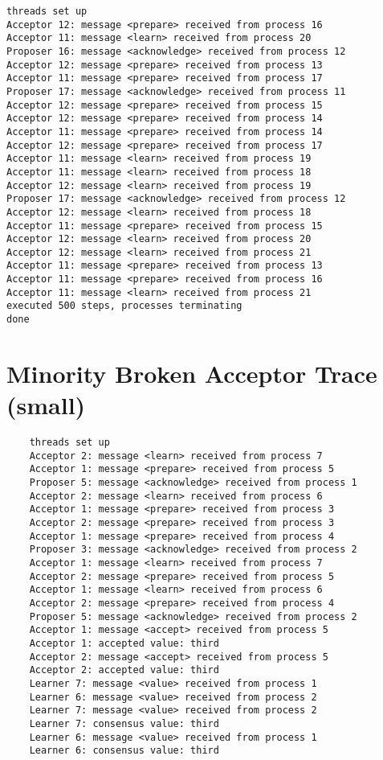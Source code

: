 \documentclass[a4paper, 12pt]{article}
\begin{document}
\begin{lstlisting}
threads set up
Acceptor 12: message <prepare> received from process 16
Acceptor 11: message <learn> received from process 20
Proposer 16: message <acknowledge> received from process 12
Acceptor 12: message <prepare> received from process 13
Acceptor 11: message <prepare> received from process 17
Proposer 17: message <acknowledge> received from process 11
Acceptor 12: message <prepare> received from process 15
Acceptor 12: message <prepare> received from process 14
Acceptor 11: message <prepare> received from process 14
Acceptor 12: message <prepare> received from process 17
Acceptor 11: message <learn> received from process 19
Acceptor 11: message <learn> received from process 18
Acceptor 12: message <learn> received from process 19
Proposer 17: message <acknowledge> received from process 12
Acceptor 12: message <learn> received from process 18
Acceptor 11: message <prepare> received from process 15
Acceptor 12: message <learn> received from process 20
Acceptor 12: message <learn> received from process 21
Acceptor 11: message <prepare> received from process 13
Acceptor 11: message <prepare> received from process 16
Acceptor 11: message <learn> received from process 21
executed 500 steps, processes terminating
done
\end{lstlisting}

\section{Minority Broken Acceptor Trace (small)}\label{app:minorityAcceptorFailure:1}

\begin{lstlisting}
    threads set up
    Acceptor 2: message <learn> received from process 7
    Acceptor 1: message <prepare> received from process 5
    Proposer 5: message <acknowledge> received from process 1
    Acceptor 2: message <learn> received from process 6
    Acceptor 1: message <prepare> received from process 3
    Acceptor 2: message <prepare> received from process 3
    Acceptor 1: message <prepare> received from process 4
    Proposer 3: message <acknowledge> received from process 2
    Acceptor 1: message <learn> received from process 7
    Acceptor 2: message <prepare> received from process 5
    Acceptor 1: message <learn> received from process 6
    Acceptor 2: message <prepare> received from process 4
    Proposer 5: message <acknowledge> received from process 2
    Acceptor 1: message <accept> received from process 5
    Acceptor 1: accepted value: third
    Acceptor 2: message <accept> received from process 5
    Acceptor 2: accepted value: third
    Learner 7: message <value> received from process 1
    Learner 6: message <value> received from process 2
    Learner 7: message <value> received from process 2
    Learner 7: consensus value: third
    Learner 6: message <value> received from process 1
    Learner 6: consensus value: third
\end{lstlisting}
\end{document}
